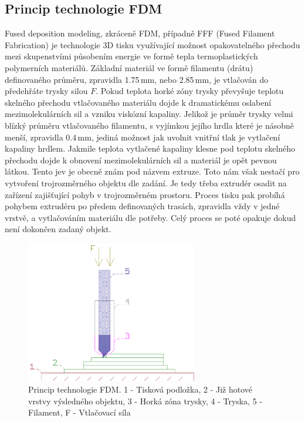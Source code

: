\subsection{Princip technologie FDM}
Fused deposition modeling, zkráceně FDM, případně FFF (Fused Filament Fabrication) je technologie 3D tisku využívající možnost opakovatelného přechodu mezi skupenstvími působením energie ve formě tepla termoplastických polymerních materiálů. Základní materiál ve formě filamentu (drátu) definovaného průměru, zpravidla 1.75\,mm, nebo 2.85\,mm, je vtlačován do předehřáte trysky silou $F$. Pokud teplota horké zóny trysky převyšuje teplotu skelného přechodu vtlačovaného materiálu dojde k dramatickému oslabení mezimolekulárních sil a vzniku viskózní kapaliny. Jelikož je průměr trysky velmi blízký průměru vtlačovaného filamentu, s vyjímkou jejího hrdla které je násobně menší, zpravidla 0.4\,mm, jediná možnost jak uvolnit vnitřní tlak je vytlačení kapaliny hrdlem. Jakmile teplota vytlačené kapaliny klesne pod teplotu skelného přechodu dojde k obnovení mezimolekulárních sil a materiál je opět pevnou látkou. Tento jev je obecně znám pod názvem extruze.
Toto nám však nestačí pro vytvoření trojrozměrného objektu dle zadání. Je tedy třeba extrudér osadit na zařízení zajišťující pohyb v trojrozměrném prostoru.
Proces tisku pak probíhá pohybem extrudéru po předem definovaných trasách, zpravidla vždy v jedné vrstvě, a vytlačováním materiálu dle potřeby. Celý proces se poté opakuje dokud není dokončen zadaný objekt.
\begin{figure}[h]
\begin{center}
\includegraphics[width=7.5cm]{pics/fdm}
\caption{Princip technologie FDM. 1 - Tisková podložka, 2 - Již hotové vrstvy výsledného objektu, 3 - Horká zóna trysky, 4 - Tryska, 5 - Filament, F - Vtlačovací síla}
\end{center}
\end{figure}


